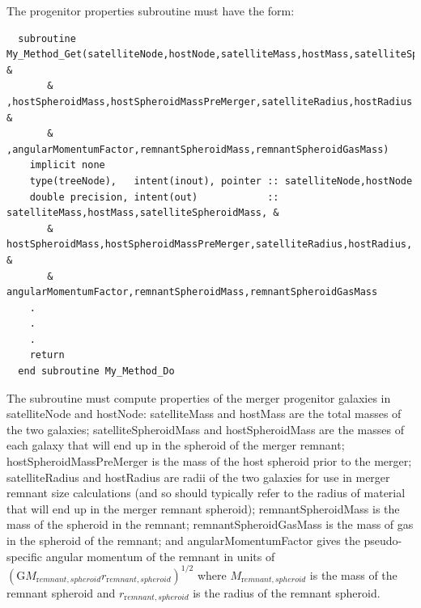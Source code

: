 The progenitor properties subroutine must have the form:
\begin{verbatim}
  subroutine My_Method_Get(satelliteNode,hostNode,satelliteMass,hostMass,satelliteSpheroidMass &
       & ,hostSpheroidMass,hostSpheroidMassPreMerger,satelliteRadius,hostRadius &
       & ,angularMomentumFactor,remnantSpheroidMass,remnantSpheroidGasMass)
    implicit none
    type(treeNode),   intent(inout), pointer :: satelliteNode,hostNode
    double precision, intent(out)            :: satelliteMass,hostMass,satelliteSpheroidMass, &
       & hostSpheroidMass,hostSpheroidMassPreMerger,satelliteRadius,hostRadius, &
       & angularMomentumFactor,remnantSpheroidMass,remnantSpheroidGasMass
    .
    .
    .
    return
  end subroutine My_Method_Do
\end{verbatim}
The subroutine must compute properties of the merger progenitor galaxies in {\normalfont \ttfamily satelliteNode} and {\normalfont \ttfamily hostNode}: {\normalfont \ttfamily satelliteMass} and {\normalfont \ttfamily hostMass} are the total masses of the two galaxies; {\normalfont \ttfamily satelliteSpheroidMass} and {\normalfont \ttfamily hostSpheroidMass} are the masses of each galaxy that will end up in the spheroid of the merger remnant; {\normalfont \ttfamily hostSpheroidMassPreMerger} is the mass of the host spheroid prior to the merger; {\normalfont \ttfamily satelliteRadius} and {\normalfont \ttfamily hostRadius} are radii of the two galaxies for use in merger remnant size calculations (and so should typically refer to the radius of material that will end up in the merger remnant spheroid); {\normalfont \ttfamily remnantSpheroidMass} is the mass of the spheroid in the remnant; {\normalfont \ttfamily remnantSpheroidGasMass} is the mass of gas in the spheroid of the remnant; and {\normalfont \ttfamily angularMomentumFactor} gives the pseudo-specific angular momentum of the remnant in units of $({\mathrm G} M_{\mathrm remnant,spheroid} r_{\mathrm remnant,spheroid})^{1/2}$ where $M_{\mathrm remnant,spheroid}$ is the mass of the 
remnant spheroid and $r_{\mathrm remnant,spheroid}$ is the radius of the remnant spheroid.

